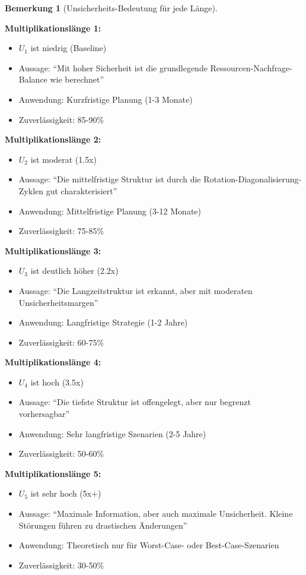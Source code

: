 \documentclass[a4paper,12pt]{article}
\theoremstyle{definition}
\newtheorem{bemerkung}{Bemerkung}
\begin{document}
\begin{bemerkung}[Unsicherheits-Bedeutung für jede Länge]
\label{bem:unsicherheit_bedeutung}

\textbf{Multiplikationslänge 1:}
\begin{itemize}
\item $U_1$ ist niedrig (Baseline)
\item Aussage: ``Mit hoher Sicherheit ist die grundlegende Ressourcen-Nachfrage-Balance wie berechnet''
\item Anwendung: Kurzfristige Planung (1-3 Monate)
\item Zuverlässigkeit: 85-90\%
\end{itemize}

\textbf{Multiplikationslänge 2:}
\begin{itemize}
\item $U_2$ ist moderat (1.5x)
\item Aussage: ``Die mittelfristige Struktur ist durch die Rotation-Diagonalisierung-Zyklen gut charakterisiert''
\item Anwendung: Mittelfristige Planung (3-12 Monate)
\item Zuverlässigkeit: 75-85\%
\end{itemize}

\textbf{Multiplikationslänge 3:}
\begin{itemize}
\item $U_3$ ist deutlich höher (2.2x)
\item Aussage: ``Die Langzeitstruktur ist erkannt, aber mit moderaten Unsicherheitsmargen''
\item Anwendung: Langfristige Strategie (1-2 Jahre)
\item Zuverlässigkeit: 60-75\%
\end{itemize}

\textbf{Multiplikationslänge 4:}
\begin{itemize}
\item $U_4$ ist hoch (3.5x)
\item Aussage: ``Die tiefste Struktur ist offengelegt, aber nur begrenzt vorhersagbar''
\item Anwendung: Sehr langfristige Szenarien (2-5 Jahre)
\item Zuverlässigkeit: 50-60\%
\end{itemize}

\textbf{Multiplikationslänge 5:}
\begin{itemize}
\item $U_5$ ist sehr hoch (5x+)
\item Aussage: ``Maximale Information, aber auch maximale Unsicherheit. Kleine Störungen führen zu drastischen Änderungen''
\item Anwendung: Theoretisch nur für Worst-Case- oder Best-Case-Szenarien
\item Zuverlässigkeit: 30-50\%
\end{itemize}

\end{bemerkung}
\end{document}
